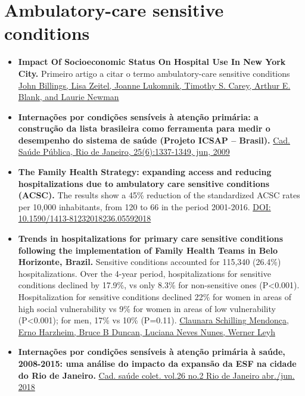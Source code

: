 \documentclass[]{book}
\begin{document}
\hypertarget{ambulatory-care-sensitive-conditions}{%
\section*{Ambulatory-care sensitive conditions}\label{ambulatory-care-sensitive-conditions}}

\begin{itemize}
\item
  \textbf{Impact Of Socioeconomic Status On Hospital Use In New York City.} Primeiro artigo a citar o termo ambulatory-care sensitive conditions \href{https://www.healthaffairs.org/doi/pdf/10.1377/hlthaff.12.1.162}{John Billings, Lisa Zeitel, Joanne Lukomnik, Timothy S. Carey, Arthur E. Blank, and Laurie Newman}
\item
  \textbf{Internações por condições sensíveis à atenção primária: a construção da lista brasileira como ferramenta para medir o desempenho do sistema de saúde (Projeto ICSAP -- Brasil).} \href{http://www.scielo.br/pdf/csp/v25n6/16.pdf}{Cad. Saúde Pública, Rio de Janeiro, 25(6):1337-1349, jun, 2009}
\item
  \textbf{The Family Health Strategy: expanding access and reducing hospitalizations due to ambulatory care sensitive conditions (ACSC).} The results show a 45\% reduction of the standardized ACSC rates per 10,000 inhabitants, from 120 to 66 in the period 2001-2016. \href{http://www.scielo.br/pdf/csc/v23n6/en_1413-8123-csc-23-06-1903.pdf}{DOI: 10.1590/1413-81232018236.05592018}
\item
  \textbf{Trends in hospitalizations for primary care sensitive conditions following the implementation of Family Health Teams in Belo Horizonte, Brazil.} Sensitive conditions accounted for 115,340 (26.4\%) hospitalizations. Over the 4-year period, hospitalizations for sensitive conditions declined by 17.9\%, vs only 8.3\% for non-sensitive ones (P\textless{}0.001). Hospitalization for sensitive conditions declined 22\% for women in areas of high social vulnerability vs 9\% for women in areas of low vulnerability (P\textless{}0.001); for men, 17\% vs 10\% (P=0.11). \href{https://academic.oup.com/heapol/article/27/4/348/605470}{Claunara Schilling Mendonça, Erno Harzheim, Bruce B Duncan, Luciana Neves Nunes, Werner Leyh}
\item
  \textbf{Internações por condições sensíveis à atenção primária à saúde, 2008-2015: uma análise do impacto da expansão da ESF na cidade do Rio de Janeiro.} \href{http://www.scielo.br/scielo.php?script=sci_arttext\&pid=S1414-462X2018000200178\&lng=pt\&nrm=iso\&tlng=pt}{Cad. saúde colet. vol.26 no.2 Rio de Janeiro abr./jun. 2018}\\

\end{itemize}
\end{document}

